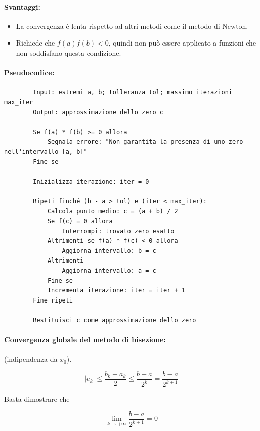 \documentclass[a4paper, 11pt]{article}
\begin{document}
        \paragraph{Svantaggi:}
        \begin{itemize}
            \item La convergenza è lenta rispetto ad altri metodi come il metodo di Newton.
            \item Richiede che \( f(a)f(b) < 0 \), quindi non può essere applicato a funzioni che non soddisfano questa condizione.
        \end{itemize}

        \paragraph{Pseudocodice:}
        \begin{verbatim}
        Input: estremi a, b; tolleranza tol; massimo iterazioni max_iter
        Output: approssimazione dello zero c

        Se f(a) * f(b) >= 0 allora
            Segnala errore: "Non garantita la presenza di uno zero nell'intervallo [a, b]"
        Fine se

        Inizializza iterazione: iter = 0

        Ripeti finché (b - a > tol) e (iter < max_iter):
            Calcola punto medio: c = (a + b) / 2
            Se f(c) = 0 allora
                Interrompi: trovato zero esatto
            Altrimenti se f(a) * f(c) < 0 allora
                Aggiorna intervallo: b = c
            Altrimenti
                Aggiorna intervallo: a = c
            Fine se
            Incrementa iterazione: iter = iter + 1
        Fine ripeti

        Restituisci c come approssimazione dello zero
        \end{verbatim}

        \paragraph{Convergenza globale del metodo di bisezione:}
        (indipendenza da \( x_0 \)).

        \[
        |e_k| \leq \frac{b_k-a_k}{2} \leq \frac{b-a}{2^k} = \frac{b-a}{2^{k+1}}
        \]

        Basta dimostrare che 

        \[
        \lim_{k \to +\infty} \frac{b-a}{2^{k+1}} = 0
        \]
\end{document}

